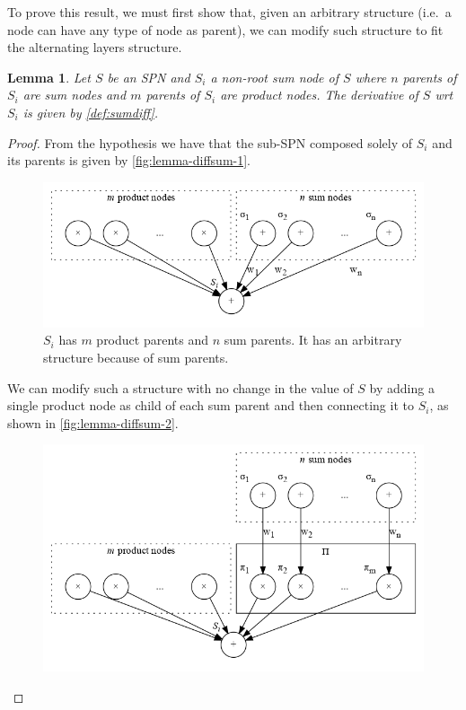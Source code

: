 \documentclass{amsart}
\theoremstyle{plain}
\newcounter{dummy-def}\numberwithin{dummy-def}{section}
\newcounter{dummy-thm}\numberwithin{dummy-thm}{section}
\newcounter{dummy-prop}\numberwithin{dummy-prop}{section}
\newcounter{dummy-corollary}\numberwithin{dummy-corollary}{section}
\newcounter{dummy-lemma}\numberwithin{dummy-lemma}{section}
\newtheorem{lemma}[dummy-lemma]{Lemma}
\newcounter{dummy-ex}\numberwithin{dummy-ex}{section}
\newcounter{dummy-eg}\numberwithin{dummy-eg}{section}
\numberwithin{equation}{section}
\begin{document}
To prove this result, we must first show that, given an arbitrary structure (i.e.\ a node can
have any type of node as parent), we can modify such structure to fit the alternating layers
structure.

\begin{lemma}\label{lemma:diffsum} Let $S$ be an SPN and $S_i$ a non-root sum node of $S$ where $n$
  parents of $S_i$ are sum nodes and $m$ parents of $S_i$ are product nodes. The derivative of $S$
  wrt $S_i$ is given by \autoref{def:sumdiff}.
\end{lemma}
\begin{proof}
  From the hypothesis we have that the sub-SPN composed solely of $S_i$ and its parents is given by
  \autoref{fig:lemma-diffsum-1}.
  \begin{figure}[h]
    \centering\includegraphics[scale=0.5]{graphs/lemma-diffsum-1.png}
    \caption{$S_i$ has $m$ product parents and $n$ sum parents. It has an arbitrary
    structure because of sum parents.}\label{fig:lemma-diffsum-1}
  \end{figure}
  We can modify such a structure with no change in the value of $S$ by adding a single product node
  as child of each sum parent and then connecting it to $S_i$, as shown in
  \autoref{fig:lemma-diffsum-2}.
  \begin{figure}[h]
    \centering\includegraphics[scale=0.5]{graphs/lemma-diffsum-2.png}

\end{figure}
\end{proof}
\end{document}

